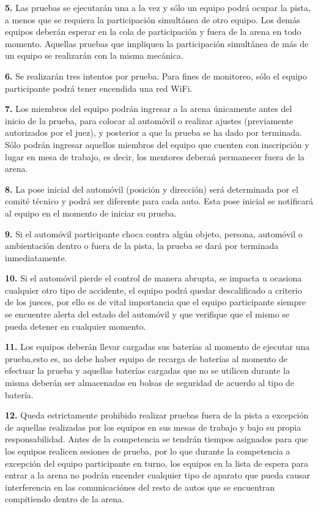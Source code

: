 \documentclass[letterpaper,12pt]{article}
\begin{document}
\textbf{5.} Las pruebas se ejecutarán una a la vez y sólo un equipo podrá ocupar la pista, a menos que se requiera la participación simultánea de otro equipo. Los demás equipos deberán esperar en la cola de participación y fuera de la arena en todo momento. Aquellas pruebas que impliquen la participación simultánea de más de un equipo se realizarán con la misma mecánica.

\textbf{6.} Se realizarán tres intentos por prueba. Para fines de monitoreo, sólo el equipo participante podrá tener encendida una red WiFi.

\textbf{7.} Los miembros del equipo podrán ingresar a la arena únicamente antes del inicio de la prueba, para colocar al automóvil o realizar ajustes (previamente autorizados por el juez), y posterior a que la prueba se ha dado por terminada. Sólo podrán ingresar aquellos miembros del equipo que cuenten con inscripción y lugar en mesa de trabajo, es decir, los mentores deberań permanecer fuera de la arena.

\textbf{8.} La pose inicial del automóvil (posición y dirección) será determinada por el comité técnico y podrá ser diferente para cada auto. Esta pose inicial se notificará al equipo en el momento de iniciar su prueba.

\textbf{9.} Si el automóvil participante choca contra algún objeto, persona, automóvil o ambientación dentro o fuera de la pista, la prueba se dará por terminada inmediatamente.

\textbf{10.} Si el automóvil pierde el control de manera abrupta, se impacta u ocasiona cualquier otro tipo de accidente, el equipo podrá quedar descalificado a criterio de los jueces, por ello es de vital importancia que el equipo participante siempre se encuentre alerta del estado del automóvil y que verifique que el mismo se pueda detener en cualquier momento.

\textbf{11.} Los equipos deberán llevar cargadas sus baterías al momento de ejecutar una prueba,esto es, no debe haber equipo de recarga de baterías al momento de efectuar la prueba y aquellas baterías cargadas que no se utilicen durante la misma deberán ser almacenadas en bolsas de seguridad de acuerdo al tipo de batería.

\textbf{12.} Queda estrictamente prohibido realizar pruebas fuera de la pista a excepción de aquellas realizadas por los equipos en sus mesas de trabajo y bajo su propia responsabilidad. Antes de la competencia se tendrán tiempos asignados para que los equipos realicen sesiones de
prueba, por lo que durante la competencia a excepción del equipo participante en turno, los equipos en la lista de espera para entrar a la arena no podrán encender cualquier tipo de aparato que pueda causar interferencia en las comunicaciónes del resto de autos que se encuentran
compitiendo dentro de la arena.
\end{document}

